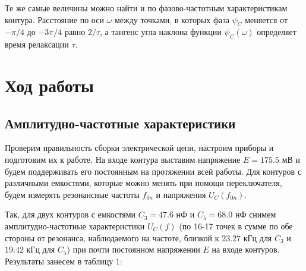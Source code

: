 \documentclass[a4paper,12pt]{article} %
\begin{document}
\hfill \break Те же самые величины можно найти и по фазово-частотным характеристикам контура. Расстояние по оси $\omega$ между точками, в которых фаза $\psi_{C}$ меняется от $-\pi/4$ до $-3\pi/4$ равно $2/\tau$, а тангенс угла наклона функции $\psi_{C} (\omega)$ определяет время релаксации $\tau$.

\section{Ход работы}

\subsection{Амплитудно-частотные характеристики}
\hfill \break Проверим правильность сборки электрической цепи, настроим приборы и подготовим их к работе. На входе контура выставим напряжение $E =  175.5$ мВ и будем поддерживать его постоянным на протяжении всей работы. Для контуров с различными емкостями, которые можно менять при помощи переключателя, будем измерять резонансные частоты $f_{0n}$ и напряжения $U_{C}(f_{0n})$. 

\hfill \break Так, для двух контуров с емкостями $C_{3} = 47.6$ нФ и $C_{5} = 68.0$ нФ снимем амплитудно-частотные характеристики $U_{C}(f)$ (по 16-17 точек в сумме по обе стороны от резонанса, наблюдаемого на частоте, близкой к $23.27$ кГц для $C_{3}$ и $19.42$ кГц для $C_{5}$) при почти постоянном напряжении $E$ на входе контуров. Результаты занесем в таблицу 1:
\end{document}
